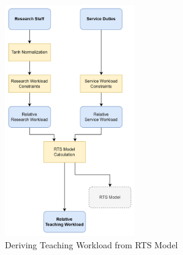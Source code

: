 \begin{figure}[H]
  \includegraphics[width=0.5\textwidth]{images/faculty_wam.png}
  \centering
  \caption{Deriving Teaching Workload from RTS Model}
  \label{fig:faculty_wam}
\end{figure}





